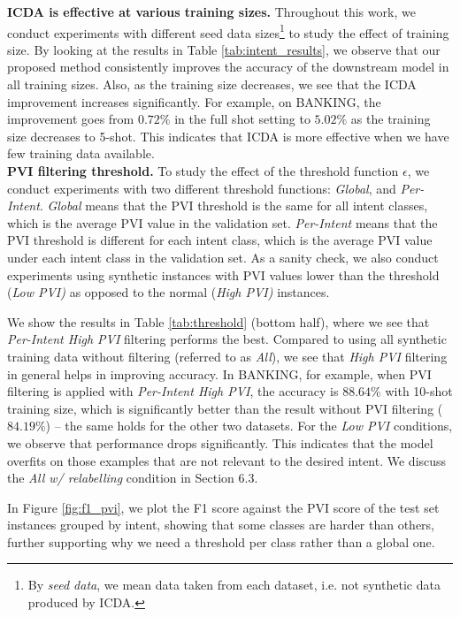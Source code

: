 \documentclass[11pt]{article}
\begin{document}
\noindent \textbf{ICDA is effective at various training sizes.}
Throughout this work, we conduct experiments with different seed data sizes\footnote{By \emph{seed data}, we mean data taken from each dataset, i.e. not synthetic data produced by ICDA.} to study the effect of training size.
By looking at the results in Table \ref{tab:intent_results}, we observe that our proposed method consistently improves the accuracy of the downstream model in all training sizes.
Also, as the training size decreases, we see that the ICDA improvement increases significantly.
For example, on BANKING, the improvement goes from $0.72\%$ in the full shot setting to $5.02\%$ as the training size decreases to 5-shot.
This indicates that ICDA is more effective when we have few training data available. \\

\noindent \textbf{PVI filtering threshold.}
To study the effect of the threshold function $\epsilon$, we conduct experiments with two different threshold functions: \textit{Global}, and \textit{Per-Intent}. 
\textit{Global} means that the PVI threshold is the same for all intent classes, which is the average PVI value in the validation set.
\textit{Per-Intent} means that the PVI threshold is different for each intent class, which is the average PVI value under each intent class in the validation set. As a sanity check, we also conduct experiments using synthetic instances with PVI values lower than the threshold (\textit{Low PVI)} as opposed to the normal (\textit{High PVI)} instances.

We show the results in Table \ref{tab:threshold} (bottom half), where we see that \textit{Per-Intent High PVI} filtering performs the best. 
Compared to using all synthetic training data without filtering (referred to as \textit{All}), we see that \textit{High PVI} filtering in general helps in improving accuracy.
In BANKING, for example, when PVI filtering is applied with \textit{Per-Intent High PVI}, the accuracy is $88.64\%$ with 10-shot training size, which is significantly better than the result without PVI filtering ($84.19\%$) -- the same holds for the other two datasets. 
For the \textit{Low PVI} conditions, we observe that performance drops significantly.
This indicates that the model overfits on those examples that are not relevant to the desired intent. We discuss the \textit{All w/ relabelling} condition in Section 6.3. 

In Figure \ref{fig:f1_pvi}, we plot the F1 score against the PVI score of the test set instances grouped by intent, showing that some classes are harder than others, further supporting why we need a threshold per class rather than a global one.
\end{document}
